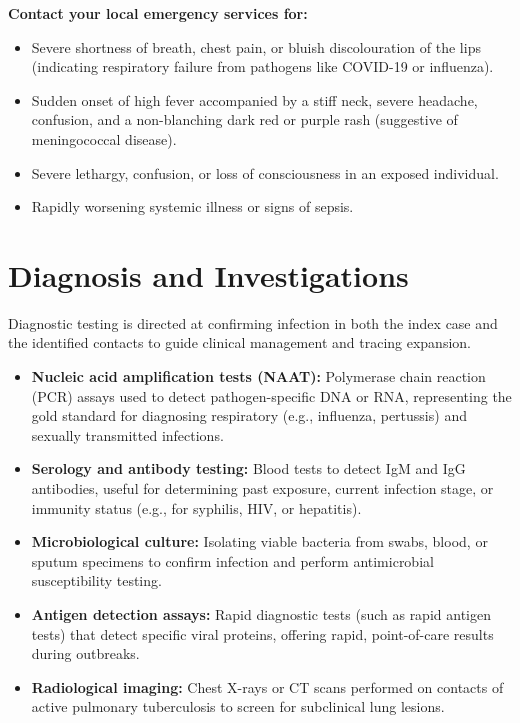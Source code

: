 \textbf{Contact your local emergency services for:}
\begin{itemize}
    \item Severe shortness of breath, chest pain, or bluish discolouration of the lips (indicating respiratory failure from pathogens like COVID-19 or influenza).
    \item Sudden onset of high fever accompanied by a stiff neck, severe headache, confusion, and a non-blanching dark red or purple rash (suggestive of meningococcal disease).
    \item Severe lethargy, confusion, or loss of consciousness in an exposed individual.
    \item Rapidly worsening systemic illness or signs of sepsis.
\end{itemize}

\section*{Diagnosis and Investigations}
Diagnostic testing is directed at confirming infection in both the index case and the identified contacts to guide clinical management and tracing expansion.

\begin{itemize}
    \item \textbf{Nucleic acid amplification tests (NAAT):} Polymerase chain reaction (PCR) assays used to detect pathogen-specific DNA or RNA, representing the gold standard for diagnosing respiratory (e.g., influenza, pertussis) and sexually transmitted infections.
    \item \textbf{Serology and antibody testing:} Blood tests to detect IgM and IgG antibodies, useful for determining past exposure, current infection stage, or immunity status (e.g., for syphilis, HIV, or hepatitis).
    \item \textbf{Microbiological culture:} Isolating viable bacteria from swabs, blood, or sputum specimens to confirm infection and perform antimicrobial susceptibility testing.
    \item \textbf{Antigen detection assays:} Rapid diagnostic tests (such as rapid antigen tests) that detect specific viral proteins, offering rapid, point-of-care results during outbreaks.
    \item \textbf{Radiological imaging:} Chest X-rays or CT scans performed on contacts of active pulmonary tuberculosis to screen for subclinical lung lesions.
\end{itemize}

